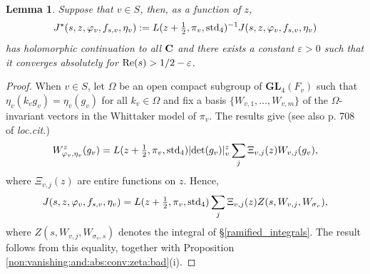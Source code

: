\documentclass[11pt, reqno]{amsart}
\theoremstyle{plain}
\newtheorem{lemma}[theorem]{Lemma}
\theoremstyle{definition}
\theoremstyle{remark}
\theoremstyle{plain}
\def\C{{\bf C}}
\def\epsilon{\varepsilon}
\def\GL{\mathbf{GL}}
\begin{document}
\begin{lemma}\label{J_ram_lemma} Suppose that $v \in S$, then, as a function of $z$, $$J^\star(s,z,\varphi_v,f_{s,v},\eta_v) :=L(z + \tfrac{1}{2}, \pi_v,{\rm std}_4)^{-1} J(s,z,\varphi_v,f_{s,v},\eta_v)$$ has holomorphic continuation to all $\C$ and there exists a constant $\epsilon > 0$ such that it converges absolutely for ${\rm Re}(s) > 1/2 - \epsilon$. 
\end{lemma}
\begin{proof}
When $v \in S$, let $\Omega$ be an open compact subgroup of $\GL_4(F_v)$ such that $\eta_v(k_v g_v) =\eta_v(g_v)$ for all $k_v \in \Omega$ and fix a basis $\{ W_{v,1}, \dots, W_{v,m}\}$ of the $\Omega$-invariant vectors in the Whittaker model of $\pi_v$. The results \cite[(1.5) \& (2.1)]{Watanabe:Global:Theta} give (see also p. 708 of \emph{loc.cit.}) 
$$W_{\varphi_v,\eta_v}^z(g_v) = L(z + \tfrac{1}{2}, \pi_v,{\rm std}_4)   | {\rm det}(g_v)|_v^{z}\sum_j \Xi_{v,j}(z)W_{v,j}(g_v),$$ where  $ \Xi_{v,j}(z)$ are entire functions on $z$. Hence, $$ J(s,z,\varphi_v,f_{s,v},\eta_v) =  L(z + \tfrac{1}{2}, \pi_v,{\rm std}_4) \sum_j \Xi_{v,j}(z) Z(s, W_{v,j}, W_{\sigma_v}),$$
where $Z(s, W_{v,j}, W_{\sigma_v,s})$ denotes the integral of \S \ref{ramified_integrals}. The result follows from this equality, together with Proposition \ref{non:vanishing:and:abs:conv:zeta:bad}(i). 
\end{proof}
\end{document}
